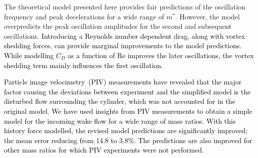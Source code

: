 \documentclass{jfm}
\begin{document}
%	
The theoretical model presented here provides fair predictions of the oscillation frequency and peak decelerations for a wide range of $m^*$. However, the model overpredicts the peak oscillation amplitudes for the second and subsequent oscillations.  \textcolor{black}{Introducing a Reynolds number dependent drag, along with vortex shedding forces, can provide marginal improvements to the model predictions. While modelling $C_D$ as a function of Re improves the later oscillations, the vortex shedding term mainly influences the first oscillation.}

\textcolor{black}{Particle image velocimetry~(PIV) measurements have revealed that the major factor causing the deviations between experiment and the simplified model is the disturbed flow surrounding the cylinder, which was not accounted for in the original model. We have used insights from PIV measurements to obtain a simple model for the incoming wake flow for a wide range of mass ratios. With this history force modelled, the revised model predictions are significantly improved; the mean error reducing from 14.8 to 3.8\%. The predictions are also improved for other mass ratios for which PIV experiments were not performed.} 
\end{document}
